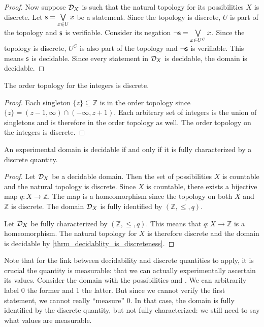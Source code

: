 \documentclass[11pt,letterpaper,fleqn]{memoir} %
\begin{document}
\begin{mathSection}
\begin{proof}
		Now suppose $\mathcal{D}_X$ is such that the natural topology for its possibilities $X$ is discrete. Let $\mathsf{s} = \bigvee\limits_{x \in U} x$ be a statement. Since the topology is discrete, $U$ is part of the topology and $\mathsf{s}$ is verifiable. Consider its negation $\neg\mathsf{s} = \bigvee\limits_{x \in U^C} x$. Since the topology is discrete, $U^C$ is also part of the topology and $\neg\mathsf{s}$ is verifiable. This means $\mathsf{s}$ is decidable. Since every statement in $\mathcal{D}_X$ is decidable, the domain is decidable.
	\end{proof}
	
	\begin{prop}
		The order topology for the integers is discrete.
	\end{prop}
	\begin{proof}
		Each singleton $\{z\} \subseteq \mathbb{Z}$ is in the order topology since $\{z\} = (z-1, \infty) \cap (-\infty, z+1)$. Each arbitrary set of integers is the union of singletons and is therefore in the order topology as well. The order topology on the integers is discrete.
	\end{proof}
	
	\begin{prop}
		An experimental domain is decidable if and only if it is fully characterized by a discrete quantity.
	\end{prop}
	
	\begin{proof}
		Let $\mathcal{D}_X$ be a decidable domain. Then the set of possibilities $X$ is countable and the natural topology is discrete. Since $X$ is countable, there exists a bijective map $q: X \to \mathbb{Z}$. The map is a homeomorphism since the topology on both $X$ and $\mathbb{Z}$ is discrete. The domain $\mathcal{D}_X$ is fully identified by $(\mathbb{Z}, \leq, q)$.
		
		Let $\mathcal{D}_X$ be fully characterized by $(\mathbb{Z}, \leq, q)$. This means that $q : X \to \mathbb{Z}$ is a homeomorphism. The natural topology for $X$ is therefore discrete and the domain is decidable by \ref{thrm_decidablity_is_discreteness}.
	\end{proof}	
	
\end{mathSection}

Note that for the link between decidability and discrete quantities to apply, it is crucial the quantity is measurable: that we can actually experimentally ascertain its values. Consider the domain with the possibilities  and . We can arbitrarily label 0 the former and 1 the latter. But since we cannot verify the first statement, we cannot really ``measure'' 0. In that case, the domain is fully identified by the discrete quantity, but not fully characterized: we still need to say what values are measurable.
\end{document}
